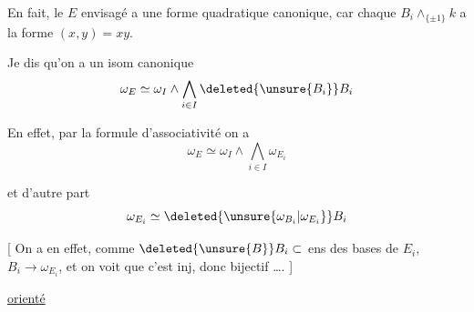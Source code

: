 En fait, le $E$ envisagé a  une
forme quadratique canonique, car chaque
$B_i\wedge_{\{\pm1\}} k$ a la forme   $(x,y)=xy$.

Je dis qu'on a un isom canonique
\[
\omega_E\simeq\omega_I\wedge\bigwedge_{i\in I}\deleted{\unsure{B_i}} B_i
\]

En effet, par la formule d'associativité on a
\[
\omega_E\simeq\omega_I\wedge\bigwedge_{i\in I}\omega_{E_i}
\]

et d'autre part
\[
\omega_{E_i}\simeq\deleted{\unsure{\omega_{B_i}|\omega_{E_i}}} B_i
\]

[ On a en effet, comme $\deleted{\unsure{B}} B_i\subset$ ens des bases de $E_i$,
$B_i\longrightarrow\omega_{E_i}$, et on voit que c'est inj, donc
bijectif \ldots. ]

\uline{} 
\uline{orienté}
